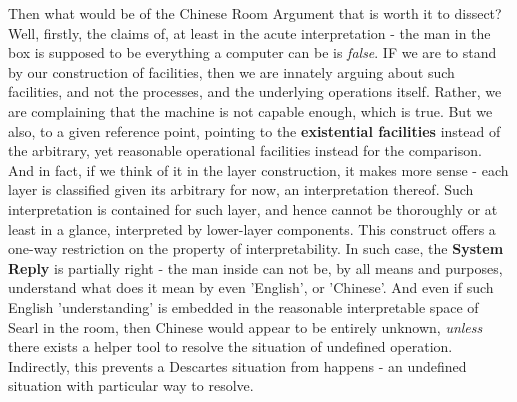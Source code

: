 Then what would be of the Chinese Room Argument that is worth it to dissect? Well, firstly, the claims of, at least in the acute interpretation - the man in the box is supposed to be everything a computer can be is \textit{false}. IF we are to stand by our construction of facilities, then we are innately arguing about such facilities, and not the processes, and the underlying operations itself. Rather, we are complaining that the machine is not capable enough, which is true. But we also, to a given reference point, pointing to the \textbf{existential facilities} instead of the arbitrary, yet reasonable operational facilities instead for the comparison. And in fact, if we think of it in the layer construction, it makes more sense - each layer is classified given its arbitrary for now, an interpretation thereof. Such interpretation is contained for such layer, and hence cannot be thoroughly or at least in a glance, interpreted by lower-layer components. This construct offers a one-way restriction on the property of interpretability. In such case, the \textbf{System Reply} is partially right - the man inside can not be, by all means and purposes, understand what does it mean by even 'English', or 'Chinese'. And even if such English 'understanding' is embedded in the reasonable interpretable space of Searl in the room, then Chinese would appear to be entirely unknown, \textit{unless} there exists a helper tool to resolve the situation of undefined operation. Indirectly, this prevents a Descartes situation from happens - an undefined situation with particular way to resolve.

